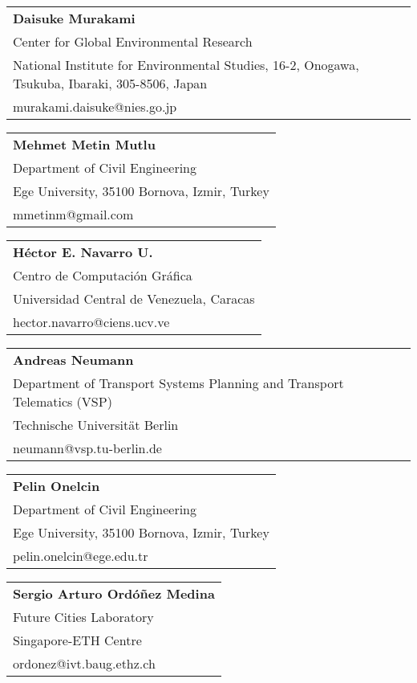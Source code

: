 \begin{tabular}[width=0.48\textwidth]{@{}l}
\textbf{Daisuke Murakami} \\
Center for Global Environmental Research \\
National Institute for Environmental Studies, 16-2, Onogawa, Tsukuba, Ibaraki, 305-8506, Japan \\
murakami.daisuke@nies.go.jp  \\
\end{tabular}

\begin{tabular}[width=0.48\textwidth]{@{}l}
\textbf{Mehmet Metin Mutlu} \\
Department of Civil Engineering \\
Ege University, 35100 Bornova, Izmir, Turkey \\
mmetinm@gmail.com \\
\end{tabular}

\begin{tabular}[width=0.48\textwidth]{@{}l}
\textbf{Héctor E. Navarro U.} \\
Centro de Computación Gráfica \\
Universidad Central de Venezuela, Caracas \\
hector.navarro@ciens.ucv.ve \\
\end{tabular}

\begin{tabular}[width=0.48\textwidth]{@{}l}
\textbf{Andreas Neumann} \\
Department of Transport Systems Planning and Transport Telematics (VSP) \\
Technische Universität Berlin \\
neumann@vsp.tu-berlin.de \\
\end{tabular}

\begin{tabular}[width=0.48\textwidth]{@{}l}
\textbf{Pelin Onelcin} \\
Department of Civil Engineering \\
Ege University, 35100 Bornova, Izmir, Turkey \\
pelin.onelcin@ege.edu.tr \\
\end{tabular}

\begin{tabular}[width=0.48\textwidth]{@{}l}
\textbf{Sergio Arturo Ordóñez Medina} \\
Future Cities Laboratory \\
Singapore-ETH Centre\\
ordonez@ivt.baug.ethz.ch \\
\end{tabular}

